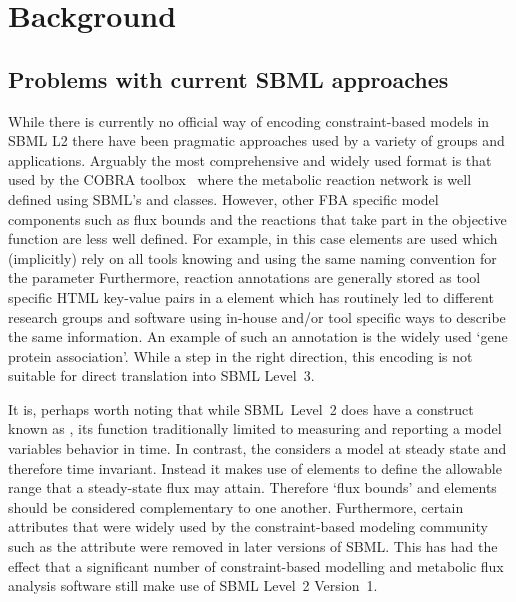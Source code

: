 
\section{Background}
\label{background}

\subsection{Problems with current SBML approaches}

While there is currently no official way of encoding constraint-based models
in SBML L2 there have been pragmatic approaches used by a variety of groups
and applications. Arguably the most comprehensive and widely used format is
that used by the \textsf{COBRA toolbox}~\citep{cobra} where the metabolic
reaction network is well defined using SBML's \Reaction and \Species
classes. However, other FBA specific model components such as flux bounds
and the reactions that take part in the objective function are less well
defined. For example, in this case \LocalParameter elements are used which (implicitly) rely on all tools knowing and using the same naming convention for the parameter  Furthermore, reaction annotations are generally stored as tool specific HTML key-value pairs in a \Notes element which has routinely
led to different research groups and software using in-house and/or tool
specific ways to describe the same information.
%
An example of such an annotation is the widely used `gene protein association'.
%
While a step in the right direction, this encoding is not suitable for
direct translation into SBML Level~3.

It is, perhaps  worth noting that while SBML~Level~2 does have a construct known as \Constraint, its function traditionally limited to measuring and reporting a model variables behavior in time. In contrast, the \FBCPackage considers a model at steady state and therefore time invariant. Instead it makes use of \Parameter elements to define the allowable range that a steady-state flux may attain. Therefore `flux bounds' and \Constraint elements should be considered complementary to one another.
%
Furthermore, certain attributes that were widely used by the constraint-based modeling community such as the \Species attribute  were removed in later versions of SBML. This has had the effect that a significant number of constraint-based modelling and metabolic flux analysis software still make use of SBML Level~2 Version~1.


